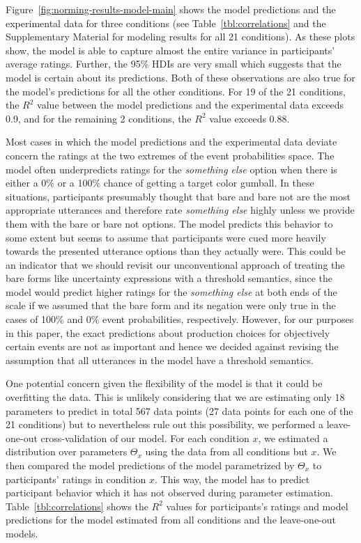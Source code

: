 \documentclass[lucida,biblatex]{sp} %
\begin{document}
Figure~\ref{fig:norming-results-model-main} shows the model predictions and the experimental data for three conditions 
(see Table~\ref{tbl:correlations} and the Supplementary Material for modeling results for all 21 conditions). As these plots show, the model
is able to capture almost the entire variance in participants' average ratings. Further, the 95\% HDIs are very small which suggests
that the model is certain about its predictions. Both of these observations are also true for the model's predictions for all the other
conditions. For 19 of the 21 conditions, the $R^2$ value between the model predictions and the experimental data exceeds 0.9,
and for the remaining 2 conditions, the $R^2$ value exceeds 0.88. 

Most cases in which the model predictions and the experimental data deviate concern the ratings at the two extremes of the event probabilities space.
The model often underpredicts ratings for the \textit{something else} option when there is either a 0\% or a 100\% chance of 
getting a target color gumball. In these situations, participants presumably thought that {\sc bare} and {\sc bare not} are the most appropriate
utterances and therefore rate \textit{something else} highly unless we provide them with the {\sc bare} or {\sc bare not} options. The model predicts
this behavior to some extent but seems to assume that participants were cued more heavily towards the presented utterance options than they actually were.
This could be an indicator that we should revisit our unconventional approach of treating the bare forms like uncertainty expressions with a threshold semantics,
since the model would predict higher ratings for the \textit{something else} at both ends of the scale if we assumed that the bare form and its negation were only true
in the cases of 100\% and 0\% event probabilities, respectively. 
However, for our purposes in this paper, the exact predictions about production choices for objectively certain events are not as important and hence
we decided against revising the assumption that all utterances in the model have a threshold semantics.


One potential concern given the flexibility of the model is that it could be overfitting the data. 
This is unlikely considering that we are estimating only 18 parameters to predict in total 567 data points 
(27 data points for each one of the 21 conditions) but to nevertheless rule out this possibility, we performed a leave-one-out cross-validation of
our model. For each condition $x$, we estimated a distribution over parameters $\Theta_x$ using the data from all conditions but $x$. We then
compared the model predictions of the model parametrized by $\Theta_x$ to participants' ratings in condition $x$. This way, the model has to predict
participant behavior which it has not observed during parameter estimation. Table~\ref{tbl:correlations} shows the $R^2$ values for participants's
ratings and model predictions for the model estimated from all conditions and the leave-one-out models.
\end{document}
